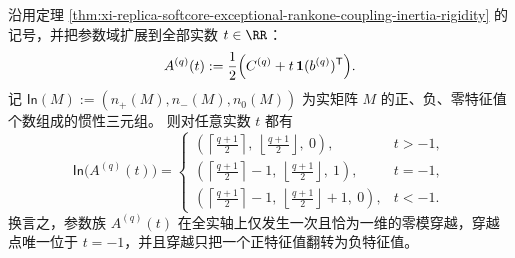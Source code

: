 \begin{theorem}[秩一耦合参数族的全实轴惯性相图与唯一零模穿越]\label{thm:xi-replica-softcore-exceptional-rankone-coupling-full-axis-inertia}
沿用定理 \ref{thm:xi-replica-softcore-exceptional-rankone-coupling-inertia-rigidity} 的记号，并把参数域扩展到全部实数 \(t\in\RR\)：
\[
A^{(q)}(t):=\frac12\Bigl(C^{(q)}+t\,\mathbf 1(b^{(q)})^{\mathsf T}\Bigr).
\]
记 \(\mathsf{In}(M):=(n_+(M),n_-(M),n_0(M))\) 为实矩阵 \(M\) 的正、负、零特征值个数组成的惯性三元组。
则对任意实数 \(t\) 都有
\[
\boxed{
\mathsf{In}\bigl(A^{(q)}(t)\bigr)
=
\begin{cases}
\left(\left\lceil\frac{q+1}{2}\right\rceil,\ \left\lfloor\frac{q+1}{2}\right\rfloor,\ 0\right),& t>-1,\\[6pt]
\left(\left\lceil\frac{q+1}{2}\right\rceil-1,\ \left\lfloor\frac{q+1}{2}\right\rfloor,\ 1\right),& t=-1,\\[6pt]
\left(\left\lceil\frac{q+1}{2}\right\rceil-1,\ \left\lfloor\frac{q+1}{2}\right\rfloor+1,\ 0\right),& t<-1.
\end{cases}}
\]
换言之，参数族 \(A^{(q)}(t)\) 在全实轴上仅发生一次且恰为一维的零模穿越，穿越点唯一位于 \(t=-1\)，并且穿越只把一个正特征值翻转为负特征值。
\end{theorem}

